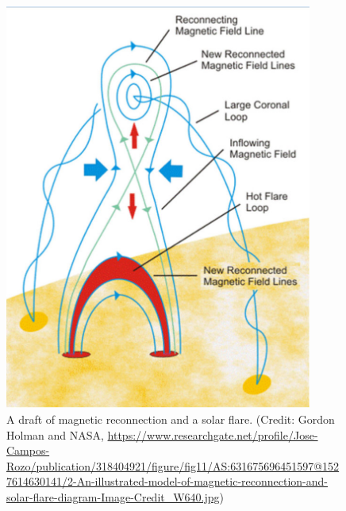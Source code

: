 \documentclass[sn-aps]{sn-jnl}%
\begin{document}
\begin{figure}[h]
\centering
\includegraphics[width=0.9\textwidth]{facsko_iccecip2022-f03.eps}
\caption{A draft of magnetic reconnection and a solar flare. (Credit: Gordon Holman and NASA, \url{https://www.researchgate.net/profile/Jose-Campos-Rozo/publication/318404921/figure/fig11/AS:631675696451597@1527614630141/2-An-illustrated-model-of-magnetic-reconnection-and-solar-flare-diagram-Image-Credit_W640.jpg})}\label{fig:reconnection}
\end{figure}
\end{document}
